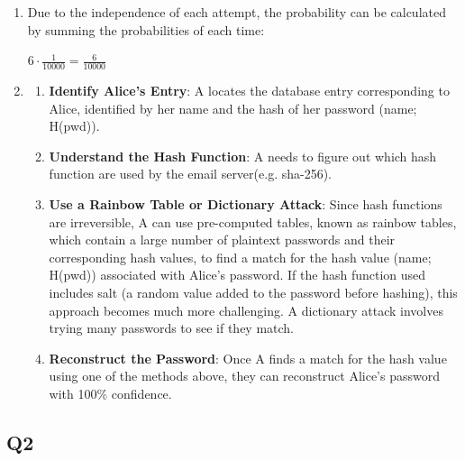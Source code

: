 \documentclass{article}
\begin{document}
	\begin{enumerate}
		\item Due to the independence of each attempt, the probability can be calculated by summing the probabilities of each time:
		\begin{center}
			$6 \cdot \frac{1}{10000} = \frac{6}{10000}$
		\end{center}

		\item 
		\begin{enumerate}
	    \item \textbf{Identify Alice's Entry}: A locates the database entry corresponding to Alice, identified by her name and the hash of her password (name; H(pwd)).
	    \item \textbf{Understand the Hash Function}: A needs to figure out which hash function are used by the email server(e.g. sha-256).
	    \item \textbf{Use a Rainbow Table or Dictionary Attack}: Since hash functions are irreversible, A can use pre-computed tables, known as rainbow tables, which contain a large number of plaintext passwords and their corresponding hash values, to find a match for the hash value (name; H(pwd)) associated with Alice's password\cite{4_Identification}. If the hash function used includes salt (a random value added to the password before hashing), this approach becomes much more challenging. A dictionary attack involves trying many passwords to see if they match.
	    \item \textbf{Reconstruct the Password}: Once A finds a match for the hash value using one of the methods above, they can reconstruct Alice's password with 100\% confidence.
	\end{enumerate}
\end{enumerate}
\subsection{Q2}
\end{document}

